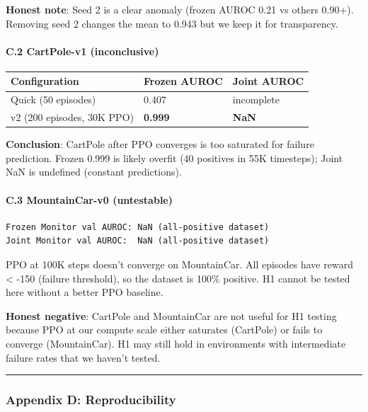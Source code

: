 \documentclass[
]{article}
\newcounter{none} %
\begin{document}
\textbf{Honest note}: Seed 2 is a clear anomaly (frozen AUROC 0.21 vs
others 0.90+). Removing seed 2 changes the mean to 0.943 but we keep it
for transparency.

\paragraph{C.2 CartPole-v1
(inconclusive)}\label{c.2-cartpole-v1-inconclusive}

{\def\LTcaptype{none} %
\begin{longtable}[]{@{}lll@{}}
\toprule\noalign{}
Configuration & Frozen AUROC & Joint AUROC \\
\midrule\noalign{}
\endhead
\bottomrule\noalign{}
\endlastfoot
Quick (50 episodes) & 0.407 & incomplete \\
v2 (200 episodes, 30K PPO) & \textbf{0.999} & \textbf{NaN} \\
\end{longtable}
}

\textbf{Conclusion}: CartPole after PPO converges is too saturated for
failure prediction. Frozen 0.999 is likely overfit (40 positives in 55K
timesteps); Joint NaN is undefined (constant predictions).

\paragraph{C.3 MountainCar-v0
(untestable)}\label{c.3-mountaincar-v0-untestable}

\begin{verbatim}
Frozen Monitor val AUROC: NaN (all-positive dataset)
Joint Monitor val AUROC:  NaN (all-positive dataset)
\end{verbatim}

PPO at 100K steps doesn't converge on MountainCar. All episodes have
reward \textless{} -150 (failure threshold), so the dataset is 100\%
positive. H1 cannot be tested here without a better PPO baseline.

\textbf{Honest negative}: CartPole and MountainCar are not useful for H1
testing because PPO at our compute scale either saturates (CartPole) or
fails to converge (MountainCar). H1 may still hold in environments with
intermediate failure rates that we haven't tested.

\begin{center}\rule{0.5\linewidth}{0.5pt}\end{center}

\subsubsection{Appendix D:
Reproducibility}\label{appendix-d-reproducibility}
\end{document}
